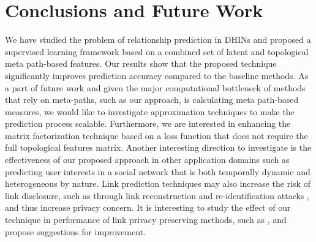 \section{Conclusions and Future Work}

We have studied the problem of relationship prediction in DHINs and proposed a supervised learning framework based on a combined set of latent and topological meta path-based features. Our results show that the proposed technique significantly improves prediction accuracy compared to the baseline methods. As a part of future work and given the major computational bottleneck of methods that rely on meta-paths, such as our approach, is calculating meta path-based measures, we would like to investigate approximation techniques to make  the prediction process scalable. Furthermore, we are interested in enhancing the matrix factorization technique based on a loss function that does not require the full topological features matrix. %
Another interesting direction to investigate is the effectiveness of our proposed approach in other application domains such as predicting user interests in a social network that is both temporally dynamic and heterogeneous by nature. Link prediction techniques may also increase the risk of link disclosure, such as through link reconstruction and re-identification attacks \cite{zheleva2008preserving,fire2013links}, and thus increase privacy concern. It is interesting to study the effect of our technique in performance of link privacy preserving methods, such as \cite{hay2008resisting,zheleva2008preserving,amin:edbt12,amin:wwwj}, and propose suggestions for improvement.







